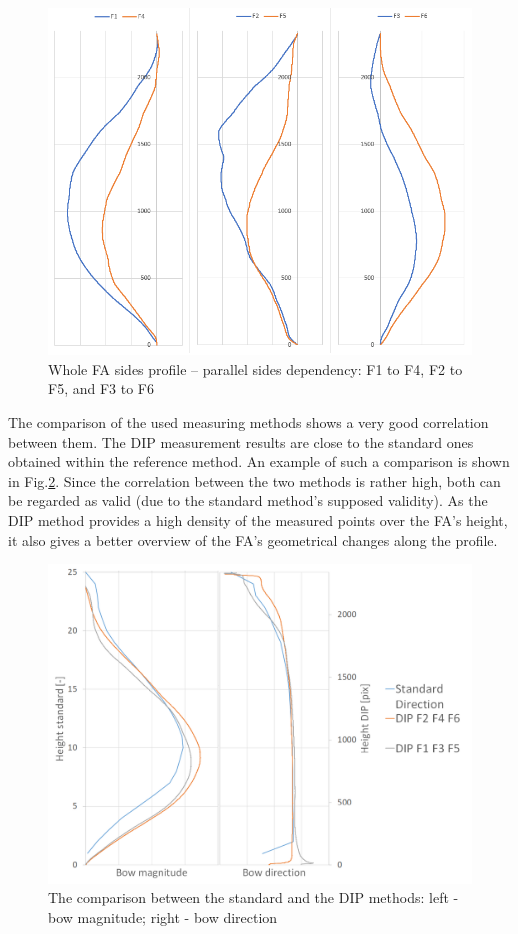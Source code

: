 \documentclass[preprint,12pt]{elsarticle}
\begin{document}
\begin{figure}
    \centering
    \includegraphics[width=\linewidth]{paralelni_strany.PNG}
    \caption{Whole FA sides profile – parallel sides dependency: F1 to F4, F2 to F5, and F3 to F6}
    \label{fig:paralelni_strany}
\end{figure}

The comparison of the used measuring methods shows a very good correlation between them. The \ac{DIP} measurement results are close to the standard ones obtained within the reference method. An example of such a comparison is shown in Fig.\ref{fig:B_bowdirr28}. Since the correlation between the two methods is rather high, both can be regarded as valid (due to the standard method's supposed validity). As the \ac{DIP} method provides a high density of the measured points over the \ac{FA}’s height, it also gives a better overview of the \ac{FA}’s geometrical changes along the profile. 

\begin{figure}
    \centering
    \includegraphics[width=\linewidth]{B_bowdirr28.png}
    \caption{The comparison between the standard and the DIP methods: left - bow magnitude; right - bow direction}
    \label{fig:B_bowdirr28}
\end{figure}
\end{document}
